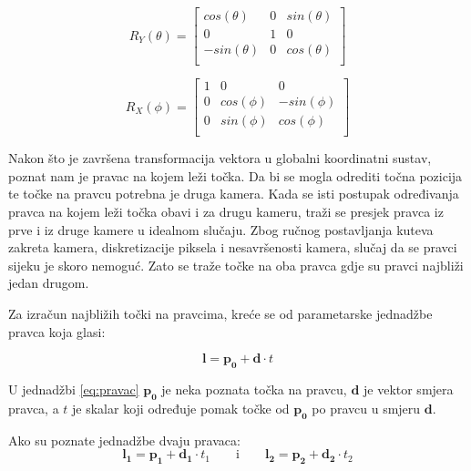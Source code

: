 \documentclass[times, utf8, diplomski]{fer}
\begin{document}
\begin{equation}
	R_{Y}(\theta) = 
	\begin{bmatrix}
		cos(\theta) & 0 & sin(\theta) \\
		0 & 1 & 0 \\
		-sin(\theta) & 0 & cos(\theta) \\
	\end{bmatrix}
\end{equation}

\begin{equation}
	R_{X}(\phi) = 
	\begin{bmatrix}
		1 & 0 & 0 \\
		0 & cos(\phi) & -sin(\phi) \\
		0 & sin(\phi) & cos(\phi) \\
	\end{bmatrix}
\end{equation}

\vspace{5mm}

Nakon što je završena transformacija vektora u globalni koordinatni sustav, poznat nam je pravac na kojem leži točka. Da bi se mogla odrediti točna pozicija te točke na pravcu potrebna je druga kamera. Kada se isti postupak određivanja pravca na kojem leži točka obavi i za drugu kameru, traži se presjek pravca iz prve i iz druge kamere u idealnom slučaju. Zbog ručnog postavljanja kuteva zakreta kamera, diskretizacije piksela i nesavršenosti kamera, slučaj da se pravci sijeku je skoro nemoguć. Zato se traže točke na oba pravca gdje su pravci najbliži jedan drugom.

Za izračun najbližih točki na pravcima, kreće se od parametarske jednadžbe pravca koja glasi:

\begin{equation}
\bm{l} = \bm{p_0} + \bm{d}\cdot t
\label{eq:pravac}
\end{equation}

\vspace{5mm}

U jednadžbi \ref{eq:pravac} $\bm{p_0}$ je neka poznata točka na pravcu, $\bm{d}$ je vektor smjera pravca, a $t$ je skalar koji određuje pomak točke od $\bm{p_0}$ po pravcu u smjeru $\bm{d}$.

Ako su poznate jednadžbe dvaju pravaca: 
\begin{equation}
\bm{l_1} = \bm{p_1} + \bm{d_1}\cdot t_1 \qquad\text{i}\qquad \bm{l_2} = \bm{p_2} + \bm{d_2}\cdot t_2
\label{eq:pravci}
\end{equation}
\end{document}

